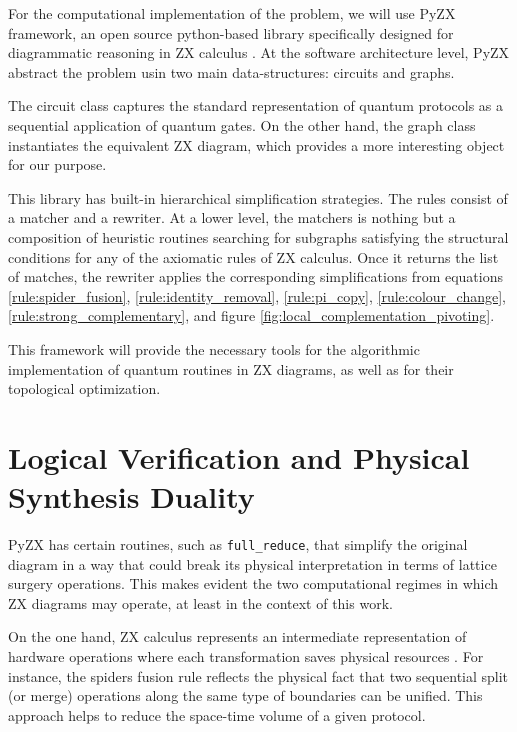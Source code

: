 \documentclass[12pt, twoside, openany]{book}
\begin{document}
For the computational implementation of the problem, we will use PyZX framework, an open source python-based library specifically designed for diagrammatic reasoning in ZX calculus \cite{Kissinger_2020}. At the software architecture level, PyZX abstract the problem usin two main data-structures: circuits and graphs. 

The circuit class captures the standard representation of quantum protocols as a sequential application of quantum gates. On the other hand, the graph class instantiates the equivalent ZX diagram, which provides a more interesting object for our purpose. 

This library has built-in hierarchical simplification strategies. The rules consist of a matcher and a rewriter. At a lower level, the matchers is nothing but a composition of heuristic routines searching for subgraphs satisfying the structural conditions for any of the axiomatic rules of ZX calculus. Once it returns the list of matches, the rewriter applies the corresponding simplifications from equations \ref{rule:spider_fusion}, \ref{rule:identity_removal}, \ref{rule:pi_copy}, \ref{rule:colour_change}, \ref{rule:strong_complementary}, and figure \ref{fig:local_complementation_pivoting}.

This framework will provide the necessary tools for the algorithmic implementation of quantum routines in ZX diagrams, as well as for their topological optimization. \\

\section{Logical Verification and Physical Synthesis Duality}

PyZX has certain routines, such as \texttt{full\_reduce}, that simplify the original diagram in a way that could break its physical interpretation in terms of lattice surgery operations. This makes evident the two computational regimes in which ZX diagrams may operate, at least in the context of this work. 

On the one hand, ZX calculus represents an intermediate representation of hardware operations where each transformation saves physical resources \cite{zhou2026topolslatticesurgerycompilation}. For instance, the spiders fusion rule reflects the physical fact that two sequential split (or merge) operations along the same type of boundaries can be unified. This approach helps to reduce the space-time volume of a given protocol. 
\end{document}
